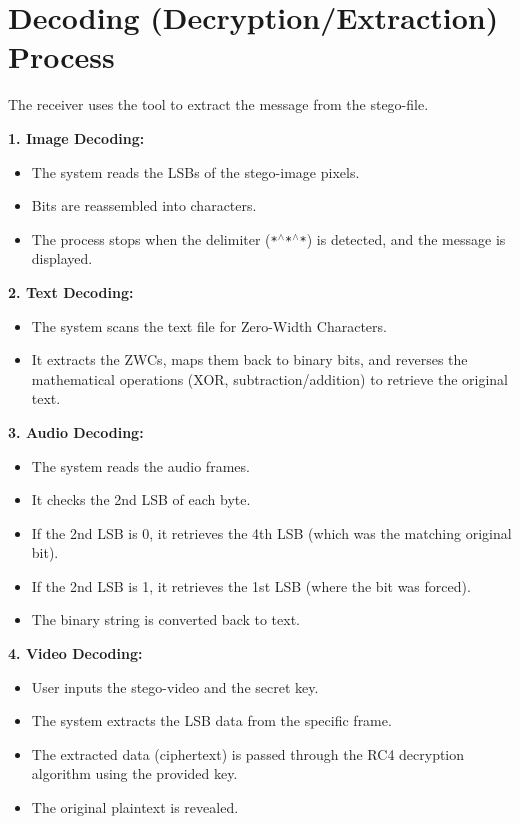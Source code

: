 \documentclass[12pt,a4paper]{report}
\begin{document}
\section{Decoding (Decryption/Extraction) Process}
The receiver uses the tool to extract the message from the stego-file.

\textbf{1. Image Decoding:}
\begin{itemize}
    \item The system reads the LSBs of the stego-image pixels.
    \item Bits are reassembled into characters.
    \item The process stops when the delimiter (\texttt{*$^\wedge$*$^\wedge$*}) is detected, and the message is displayed.
\end{itemize}

\textbf{2. Text Decoding:}
\begin{itemize}
    \item The system scans the text file for Zero-Width Characters.
    \item It extracts the ZWCs, maps them back to binary bits, and reverses the mathematical operations (XOR, subtraction/addition) to retrieve the original text.
\end{itemize}

\textbf{3. Audio Decoding:}
\begin{itemize}
    \item The system reads the audio frames.
    \item It checks the 2nd LSB of each byte. 
    \item If the 2nd LSB is 0, it retrieves the 4th LSB (which was the matching original bit).
    \item If the 2nd LSB is 1, it retrieves the 1st LSB (where the bit was forced).
    \item The binary string is converted back to text.
\end{itemize}

\textbf{4. Video Decoding:}
\begin{itemize}
    \item User inputs the stego-video and the secret key.
    \item The system extracts the LSB data from the specific frame.
    \item The extracted data (ciphertext) is passed through the RC4 decryption algorithm using the provided key.
    \item The original plaintext is revealed.
\end{itemize}
\end{document}
